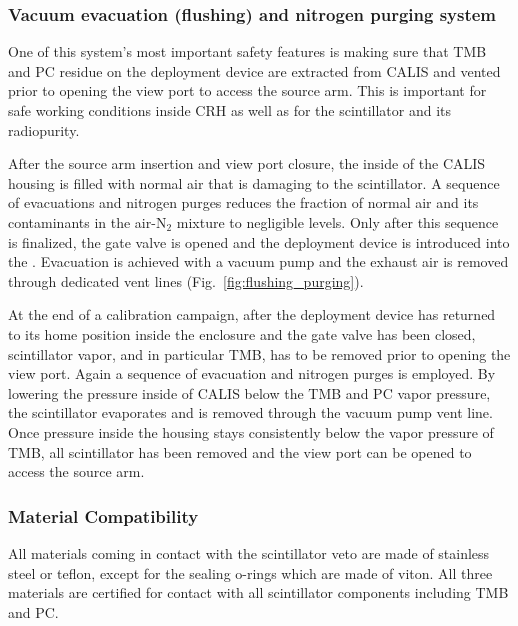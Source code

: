\subsubsection*{Vacuum evacuation (flushing) and nitrogen purging system}\label{sec:EvacPurge}
One of this system's most important safety features is making sure that TMB and PC residue on the deployment device are extracted from CALIS and vented prior to opening the view port to access the source arm. This is important for safe working conditions inside CRH as well as for the scintillator and its radiopurity. 

After the source arm insertion and view port closure, the inside of the CALIS housing is filled with normal air that is damaging to the scintillator. A sequence of evacuations and nitrogen purges reduces the fraction of normal air and its contaminants in the air-N$_2$ mixture to negligible levels. Only after this sequence is finalized, the gate valve is opened and the deployment device is introduced into the \lsv. Evacuation is achieved with a vacuum pump and the exhaust air is removed through dedicated vent lines (Fig.~\ref{fig:flushing_purging}).

At the end of a calibration campaign, after the deployment device has returned to its home position inside the enclosure and the gate valve has been closed, scintillator vapor, and in particular TMB, has to be removed prior to opening the view port. Again a sequence of evacuation and nitrogen purges is employed. By lowering the pressure inside of CALIS below the TMB and PC vapor pressure, the scintillator evaporates and is removed through the vacuum pump vent line. Once pressure inside the housing stays consistently below the vapor pressure of TMB, all scintillator has been removed and the view port can be opened to access the source arm.
 

\subsubsection*{Material Compatibility}
All materials coming in contact with the scintillator veto are made of stainless steel or teflon, except for the sealing o-rings which are made of viton. All three materials are certified for contact with all scintillator components including TMB and PC.


